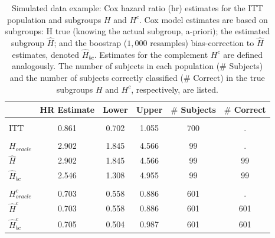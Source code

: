 \documentclass[smallextended]{svjour3}
\begin{document}
\begin{table}

\caption{\label{tab:simex_tab}\label{tab:simex} Simulated data example: Cox hazard ratio (hr) estimates for the ITT population and subgroups $H$ and $H^{c}$.
Cox model estimates are based on subgroups: H true (knowing the actual subgroup, a-priori); the estimated subgroup $\hat{H}$; and 
the boostrap ($1,000$ resamples) bias-correction to $\hat{H}$ estimates, denoted $\hat{H}_{bc}$.  Estimates for the complement $H^{c}$ are defined analogously.
The number of subjects in each population ($\#$ Subjects) and the number of subjects correctly classified ($\#$ Correct) in the true subgroups $H$ and $H^{c}$, respectively, are listed.}
\centering
\fontsize{9}{11}\selectfont
\begin{tabular}[t]{lccccc}
\toprule
  & HR Estimate & Lower & Upper & $\#$ Subjects & $\#$ Correct\\
\midrule
\addlinespace[0.3em]
\multicolumn{6}{l}{\textbf{ITT}}\\
\hspace{1em}ITT & 0.861 & 0.702 & 1.055 & 700 & .\\
\addlinespace[0.3em]
\multicolumn{6}{l}{\textbf{H subgroup estimates}}\\
\hspace{1em}$H_{oracle}$ & 2.902 & 1.845 & 4.566 & 99 & .\\
\hspace{1em}$\hat{H}$ & 2.902 & 1.845 & 4.566 & 99 & 99\\
\hspace{1em}$\hat{H}_{bc}$ & 2.546 & 1.308 & 4.955 & 99 & 99\\
\addlinespace[0.3em]
\multicolumn{6}{l}{\textbf{H-complement subgroup estimates}}\\
\hspace{1em}$H^{c}_{oracle}$ & 0.703 & 0.558 & 0.886 & 601 & .\\
\hspace{1em}$\hat{H}^{c}$ & 0.703 & 0.558 & 0.886 & 601 & 601\\
\hspace{1em}$\hat{H}^{c}_{bc}$ & 0.705 & 0.504 & 0.987 & 601 & 601\\
\bottomrule
\end{tabular}
\end{table}





\end{document}
